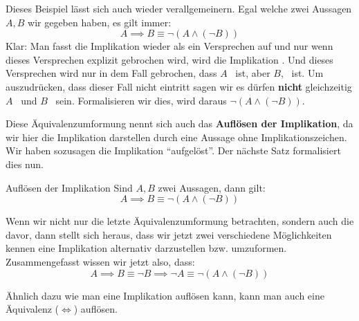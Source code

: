 \documentclass[../../main.tex]{subfiles}
\begin{document}
    Dieses Beispiel lässt sich auch wieder verallgemeinern. Egal welche zwei Aussagen $A,B$ wir 
    gegeben haben, es gilt immer:
    \[A \implies B \equiv \lnot (A \land (\lnot B))\] 
    Klar: Man fasst die Implikation wieder als 
    ein Versprechen auf und nur wenn dieses Versprechen explizit gebrochen wird,
     wird die Implikation \falsch. Und dieses Versprechen wird nur in dem Fall 
     gebrochen, dass $A$ \wahr\ ist, aber $B$, \falsch\  ist. Um auszudrücken, 
     dass dieser Fall nicht eintritt sagen wir es dürfen \textbf{nicht} gleichzeitig 
     $A$ \wahr\ und $B$ \falsch\ sein. Formalisieren wir dies, wird daraus 
     $\lnot (A \land (\lnot B))$.
    
    Diese Äquivalenzumformung nennt sich auch das \textbf{Auflösen der Implikation}, da wir hier die Implikation darstellen durch eine Aussage ohne Implikationszeichen. Wir haben sozusagen die Implikation \enquote{aufgelöst}. Der nächste Satz formalisiert dies nun.
    
    \begin{lemma}{Auflösen der Implikation}
        Sind $A,B$ zwei Aussagen, dann gilt:
        \[A \implies B \equiv \lnot (A \land (\lnot B))\]
    \end{lemma}
    
    Wenn wir nicht nur die letzte Äquivalenzumformung betrachten, sondern auch die davor, 
    dann stellt sich heraus, 
    dass wir jetzt zwei verschiedene Möglichkeiten kennen eine Implikation alternativ 
    darzustellen bzw. umzuformen. Zusammengefasst wissen wir jetzt also, dass:
     \[A \implies B \equiv \lnot B \implies \lnot A \equiv \lnot (A \land (\lnot B))\]
    
    Ähnlich dazu wie man eine Implikation auflösen kann, 
    kann man auch eine Äquivalenz ($\iff$) auflösen.
\end{document}
